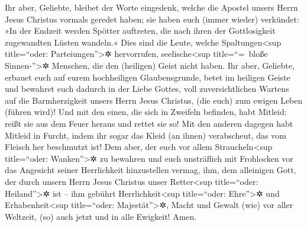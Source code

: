  Ihr aber, Geliebte, bleibet der Worte eingedenk, welche
die Apostel unsers Herrn Jesus Christus vormals geredet haben;
 sie haben euch (immer wieder) verkündet: »In der Endzeit
werden Spötter auftreten, die nach ihren der Gottlosigkeit zugewandten
Lüsten wandeln.«  Dies sind die Leute, welche
Spaltungen\textless sup title=``oder: Parteiungen''\textgreater✲
hervorrufen, seelische\textless sup title=``=~bloße
Sinnen-''\textgreater✲ Menschen, die den (heiligen) Geist nicht haben.
 Ihr aber, Geliebte, erbauet euch auf eurem hochheiligen
Glaubensgrunde, betet im heiligen Geiste  und bewahret
euch dadurch in der Liebe Gottes, voll zuversichtlichen Wartens auf die
Barmherzigkeit unsers Herrn Jesus Christus, (die euch) zum ewigen Leben
(führen wird)!  Und mit den einen, die sich in Zweifeln
befinden, habt Mitleid:  reißt sie aus dem Feuer heraus
und rettet sie so! Mit den anderen dagegen habt Mitleid in Furcht, indem
ihr sogar das Kleid (an ihnen) verabscheut, das vom Fleisch her
beschmutzt ist!  Dem aber, der euch vor allem
Straucheln\textless sup title=``oder: Wanken''\textgreater✲ zu bewahren
und euch unsträflich mit Frohlocken vor das Angesicht seiner
Herrlichkeit hinzustellen vermag,  ihm, dem alleinigen
Gott, der durch unsern Herrn Jesus Christus unser Retter\textless sup
title=``oder: Heiland''\textgreater✲ ist -- ihm gebührt
Herrlichkeit\textless sup title=``oder: Ehre''\textgreater✲ und
Erhabenheit\textless sup title=``oder: Majestät''\textgreater✲, Macht
und Gewalt (wie) vor aller Weltzeit, (so) auch jetzt und in alle
Ewigkeit! Amen.
